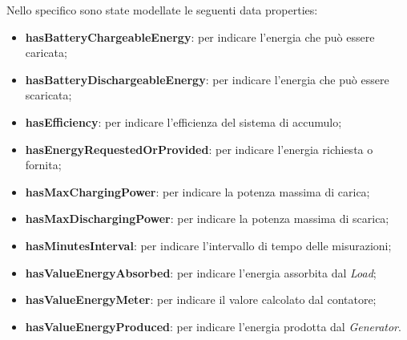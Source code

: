 Nello specifico sono state modellate le seguenti data properties:
\begin{itemize}
    \item \textbf{hasBatteryChargeableEnergy}: per indicare l'energia che può essere caricata;
    \item \textbf{hasBatteryDischargeableEnergy}: per indicare l'energia che può essere scaricata;
    \item \textbf{hasEfficiency}: per indicare l'efficienza del sistema di accumulo;
    \item \textbf{hasEnergyRequestedOrProvided}: per indicare l'energia richiesta o fornita;
    \item \textbf{hasMaxChargingPower}: per indicare la potenza massima di carica;
    \item \textbf{hasMaxDischargingPower}: per indicare la potenza massima di scarica;
    \item \textbf{hasMinutesInterval}: per indicare l'intervallo di tempo delle misurazioni;
    \item \textbf{hasValueEnergyAbsorbed}: per indicare l'energia assorbita dal \textit{Load};
    \item \textbf{hasValueEnergyMeter}: per indicare il valore calcolato dal contatore;
    \item \textbf{hasValueEnergyProduced}: per indicare l'energia prodotta dal \textit{Generator}.
\end{itemize}